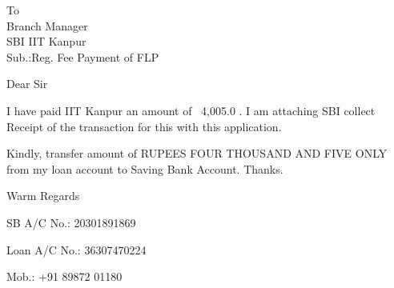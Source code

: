\documentclass{letter}
\begin{document}
\begin{letter}{To \\ Branch Manager \\ SBI IIT Kanpur \\ Sub.:Reg. Fee Payment of FLP}
\opening{Dear Sir}
I have paid IIT Kanpur an amount of \rupee~4,005.0 . I am attaching SBI collect Receipt of the transaction for this with this application. \par
Kindly, transfer amount of RUPEES FOUR THOUSAND AND FIVE ONLY from my loan account to Saving Bank Account. Thanks.
\closing{Warm Regards}

SB A/C No.: 20301891869\par
Loan A/C No.: 36307470224\par
Mob.: +91 89872 01180\par
\end{letter}
\end{document}
